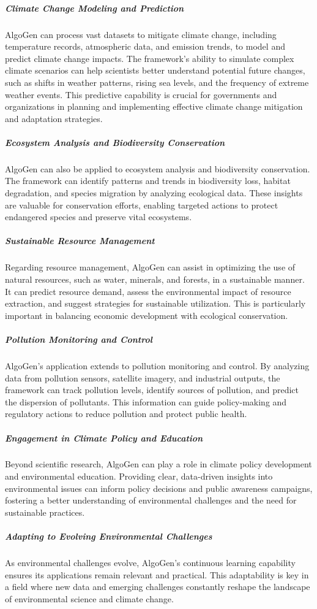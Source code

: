 \documentclass{article}
\begin{document}
\subparagraph{Climate Change Modeling and Prediction}
AlgoGen can process vast datasets to mitigate climate change, including temperature records, atmospheric data, and emission trends, to model and predict climate change impacts. The framework’s ability to simulate complex climate scenarios can help scientists better understand potential future changes, such as shifts in weather patterns, rising sea levels, and the frequency of extreme weather events. This predictive capability is crucial for governments and organizations in planning and implementing effective climate change mitigation and adaptation strategies.

\subparagraph{Ecosystem Analysis and Biodiversity Conservation}
AlgoGen can also be applied to ecosystem analysis and biodiversity conservation. The framework can identify patterns and trends in biodiversity loss, habitat degradation, and species migration by analyzing ecological data. These insights are valuable for conservation efforts, enabling targeted actions to protect endangered species and preserve vital ecosystems.

\subparagraph{Sustainable Resource Management}
Regarding resource management, AlgoGen can assist in optimizing the use of natural resources, such as water, minerals, and forests, in a sustainable manner. It can predict resource demand, assess the environmental impact of resource extraction, and suggest strategies for sustainable utilization. This is particularly important in balancing economic development with ecological conservation.

\subparagraph{Pollution Monitoring and Control}
AlgoGen’s application extends to pollution monitoring and control. By analyzing data from pollution sensors, satellite imagery, and industrial outputs, the framework can track pollution levels, identify sources of pollution, and predict the dispersion of pollutants. This information can guide policy-making and regulatory actions to reduce pollution and protect public health.

\subparagraph{Engagement in Climate Policy and Education}
Beyond scientific research, AlgoGen can play a role in climate policy development and environmental education. Providing clear, data-driven insights into environmental issues can inform policy decisions and public awareness campaigns, fostering a better understanding of environmental challenges and the need for sustainable practices.

\subparagraph{Adapting to Evolving Environmental Challenges}
As environmental challenges evolve, AlgoGen’s continuous learning capability ensures its applications remain relevant and practical. This adaptability is key in a field where new data and emerging challenges constantly reshape the landscape of environmental science and climate change.
\end{document}
